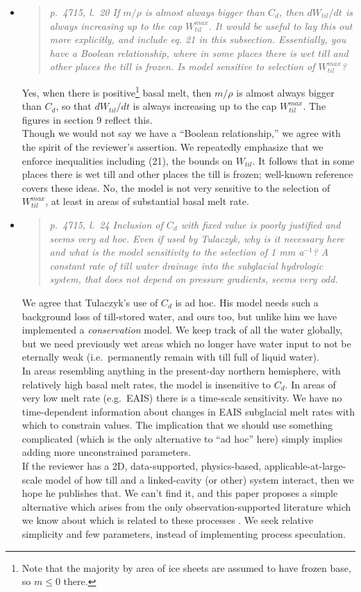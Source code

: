 \documentclass[11pt,reqno]{amsart}
\newcommand{\reply}[2]{
\medskip\medskip
\item  \begin{quote}
\emph{#1}
\end{quote}

\medskip
\noindent #2}
\begin{document}
\begin{itemize}
\reply{p.~4715, l.~20 If $m/\rho$ is almost always bigger than $C_d$, then $dW_{til}/dt$ is always increasing up to the cap $W_{til}^{max}$. It would be useful to lay this out more explicitly, and include eq. 21 in this subsection. Essentially, you have a Boolean relationship, where in some places there is wet till and other places the till is frozen. Is model sensitive to selection of $W_{til}^{max}$?}
{Yes, when there is positive\footnote{Note that the majority by area of ice sheets are assumed to have frozen base, so $m\le 0$ there.} basal melt, then $m/\rho$ is almost always bigger than $C_d$, so that $dW_{til}/dt$ is always increasing up to the cap $W_{til}^{max}$.  The figures in section 9 reflect this. \\
\indent Though we would not say we have a ``Boolean relationship,'' we agree with the spirit of the reviewer's assertion.  We repeatedly emphasize that we enforce inequalities including (21), the bounds on $W_{til}$.  It follows that in some places there is wet till and other places the till is frozen; well-known reference \cite{BBssasliding} covers these ideas.  No, the model is not very sensitive to the selection of $W_{til}^{max}$, at least in areas of substantial basal melt rate.}

\reply{p.~4715, l.~24 Inclusion of $C_d$ with fixed value is poorly justified and seems very ad hoc.  Even if used by Tulaczyk, why is it necessary here and what is the model sensitivity to the selection of 1 mm a$^{-1}$?  A constant rate of till water drainage into the subglacial hydrologic system, that does not depend on pressure gradients, seems very odd.}
{We agree that Tulaczyk's \cite{Tulaczyketal2000} use of $C_d$ is ad hoc.  His model needs such a background loss of till-stored water, and ours too, but unlike him we have implemented a \emph{conservation} model.  We keep track of all the water globally, but we need previously wet areas which no longer have water input to not be eternally weak (i.e.~permanently remain with till full of liquid water).\\
\indent In areas resembling anything in the present-day northern hemisphere, with relatively high basal melt rates, the model is insensitive to $C_d$.  In areas of very low melt rate (e.g.~EAIS) there is a time-scale sensitivity.  We have no time-dependent information about changes in EAIS subglacial melt rates with which to constrain values.  The implication that we should use something complicated (which is the only alternative to ``ad hoc'' here) simply implies adding more unconstrained parameters. \\
\indent If the reviewer has a 2D, data-supported, physics-based, applicable-at-large-scale model of how till and a linked-cavity (or other) system interact, then we hope he publishes that.  We can't find it, and this paper proposes a simple alternative which arises from the only observation-supported literature which we know about which is related to these processes \cite{Tulaczyketal2000}.  We seek relative simplicity and few parameters, instead of implementing process speculation.}


\end{itemize}
\end{document}
